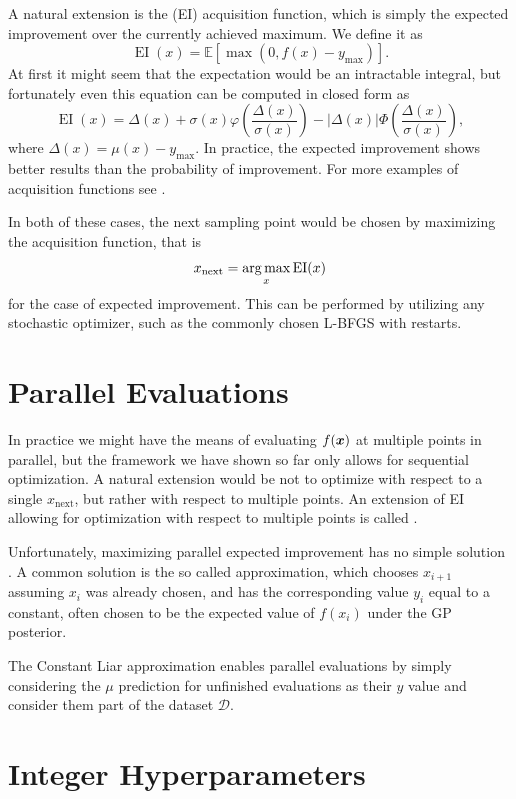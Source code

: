A natural extension is the  (EI) acquisition function,
which is simply the expected improvement over the currently achieved maximum.
We define it as $$\operatorname{EI}(x) = \mathbb{E}[\max(0, f(x) - y_{\max})].$$ At first it might seem that
the expectation would be an intractable integral, but fortunately even this
equation can be computed in closed form as
$$
\operatorname{EI}(x) = \Delta(x) + \sigma(x) \varphi \left( \frac{\Delta(x)}{\sigma(x)} \right) - |\Delta(x)| \Phi \left( \frac{\Delta(x)}{\sigma(x)} \right),
$$
where $\Delta(x) = \mu(x) - y_{\max}$. In practice, the expected improvement shows better results
than the probability of improvement. For more examples of acquisition functions see
\cite{frazier2018tutorial}.

In both of these cases, the next sampling point would be chosen by maximizing
the acquisition function, that is $$x_{\operatorname{next}} = \operatorname*{arg\,max}_x \operatorname{EI}(x)$$ for
the case of expected improvement. This can be performed by utilizing any stochastic optimizer,
such as the commonly chosen L-BFGS with restarts.


\section{Parallel Evaluations}
\label{section:parallel-evaluations}

In practice we might have the means of evaluating $f({\boldsymbol{x}})$ at multiple points
in parallel, but the framework we have shown so far only allows for sequential
optimization. A natural extension would be not to optimize with respect to a
single $x_{\operatorname{next}}$, but rather with respect to multiple points.
An extension of EI allowing for optimization with respect to multiple points is
called .

Unfortunately, maximizing parallel expected improvement has no simple solution
\citep{frazier2018tutorial}. A common solution is the so called
 approximation, which chooses $x_{i+1}$ assuming $x_i$
was already chosen, and has the corresponding value $y_i$ equal to a constant,
often chosen to be the expected value of $f(x_i)$ under the GP posterior.

The Constant Liar approximation enables parallel evaluations by simply
considering the $\mu$ prediction for unfinished evaluations as their $y$ value
and consider them part of the dataset $\mathcal{D}$.


\section{Integer Hyperparameters}
\label{section:integer-hyperparameters}

